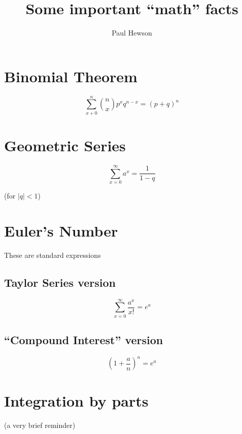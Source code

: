 \documentclass{article}
\title{Some important ``math'' facts}
\author{Paul Hewson}
\begin{document}
\sffamily
\maketitle

\section{Binomial Theorem}

\begin{displaymath}
\sum_{x+0}^n \binom{n}{x} p^x q^{n-x} = (p+q)^n 
\end{displaymath}

\section{Geometric Series}

\begin{displaymath}
\sum_{x=0}^{\infty} a^x = \frac{1}{1-q}
\end{displaymath}

(for $|q| < 1$)

\section{Euler's Number}

These are standard expressions

\subsection{Taylor Series version}

\begin{displaymath}
\sum_{x=0}^{\infty} \frac{a^x}{x!} = e^{a}
\end{displaymath}

\subsection{``Compound Interest'' version}

\begin{displaymath}
\left( 1 + \frac{a}{n} \right)^n = e^a
\end{displaymath}

\section{Integration by parts}

(a very brief reminder)
\end{document}
